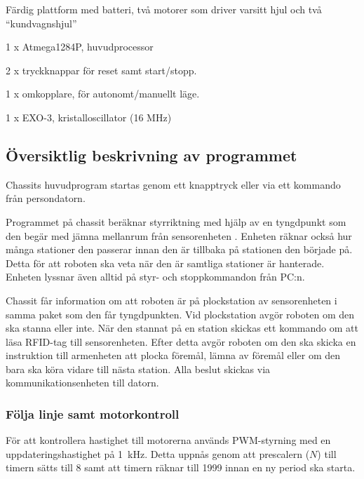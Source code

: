 \begin{packed_itemize}
\item Färdig plattform med batteri, två motorer som driver varsitt hjul och två “kundvagnshjul”
\item 1 x Atmega1284P, huvudprocessor
\item 2 x tryckknappar för reset samt start/stopp.
\item 1 x omkopplare, för autonomt/manuellt läge.
\item 1 x EXO-3, kristalloscillator (16 MHz)
\end{packed_itemize}

\subsection{Översiktlig beskrivning av programmet}

 Chassits huvudprogram startas genom ett knapptryck eller via ett kommando från persondatorn. 

Programmet på chassit beräknar styrriktning med hjälp av en tyngdpunkt som den begär med jämna mellanrum från sensorenheten . Enheten räknar också hur många stationer den passerar innan den är tillbaka på stationen den började på. Detta för att roboten ska veta när den är samtliga stationer är hanterade. Enheten lyssnar även alltid på styr- och stoppkommandon från PC:n.

Chassit får information om att roboten är på plockstation av sensorenheten i samma paket som den får tyngdpunkten. Vid plockstation avgör roboten om den ska stanna eller inte. När den stannat på en station skickas ett kommando om att läsa RFID-tag till sensorenheten. Efter detta avgör roboten om den ska skicka en instruktion till armenheten att  plocka föremål, lämna av föremål eller om den bara ska köra vidare till nästa station. Alla beslut skickas via kommunikationsenheten till datorn.


\subsubsection{Följa linje samt motorkontroll}
\label{följalinje}

För att kontrollera hastighet till motorerna används PWM-styrning med en uppdateringshastighet på 1~kHz. Detta uppnås genom att prescalern ($N$) till timern sätts till 8 samt att timern räknar till 1999 innan en ny period ska starta. 

